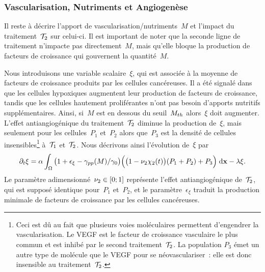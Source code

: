 \documentclass[main.tex]{subfiles}
\begin{document}
\subsubsection{Vascularisation, Nutriments et Angiogenèse}
Il reste à décrire l'apport de vascularisation/nutriments~$M$ 
et l'impact du traitement~${\mathcal T_2}$ sur celui-ci. Il est important de noter que la seconde ligne de traitement n'impacte pas directement~$M$, mais qu'elle bloque la production de facteurs de croissance qui gouvernent la quantité~$M$.

Nous introduisons une variable scalaire~$\xi$, qui est associée à la moyenne de facteurs de croissance produits par les cellules cancéreuses. 
Il a été signalé dans~\cite{Holmes2007} que les cellules hypoxiques augmentent leur production de facteurs de croissance, tandis que les cellules hautement proliférantes n'ont pas besoin d'apports nutritifs supplémentaires. Ainsi, si~$M$ est en dessous du seuil~$M_{th}$ alors~$\xi$ doit augmenter. 
L'effet antiangiogénique du 
traitement~${\mathcal T_2}$ diminue la production
de~$\xi$, mais seulement pour les cellules~$P_1$ et~$P_2$ alors que~$P_3$ est la densité de cellules insensibles\footnote{Ceci est dû au fait que plusieurs voies moléculaires permettent d'engendrer la vascularisation. Le VEGF est le facteur de croissance vasculaire le plus commun  et est inhibé par le second traitement~${\mathcal T_2}$. La population $P_3$ émet un autre type de molécule que le VEGF pour se néovasculariser~: elle est donc insensible au traitement~${\mathcal T_2}$.} à~${\mathcal T_1}$ et~${\mathcal T_2}$.
Nous décrivons ainsi l'évolution de~$\xi$ par
\begin{equation}\label{eq_xi}
\partial_t \xi = \alpha \int_\Omega \big(1+\epsilon_{\xi} - \gamma_{pp}(M) / \gamma_0 \big)\Big(\big(1-\nu_2\chi_2(t)\big)(P_1+P_2)+P_3\Big) \textrm{\;d}\mathbf{x} - \lambda \xi.
\end{equation}
Le paramètre adimensionné~$\nu_2\in [0;1]$ représente l'effet antiangiogénique de~${\mathcal T_2}$, qui est supposé identique pour~$P_1$ et~$P_2$, et le paramètre~$\epsilon_{\xi}$ traduit la production minimale de facteurs de croissance par les cellules cancéreuses. 
\end{document}
